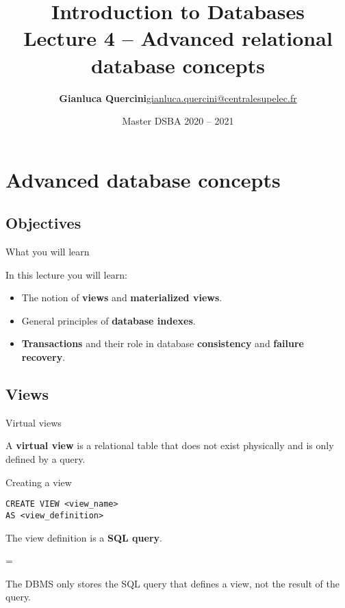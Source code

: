 \documentclass[xcolor=table]{beamer}
\title[Information systems and programming]{{\bf Introduction to Databases}\\Lecture 4 -- Advanced relational database concepts}
\author[Gianluca Quercini]{%
  {\bf Gianluca Quercini}\newline \vfill \href{mailto:gianluca.quercini@centralesupelec.fr}{\small gianluca.quercini@centralesupelec.fr} \vfill}
\date{Master DSBA 2020 -- 2021}
\newenvironment{warning}
  {\par\begin{mdframed}[linewidth=2pt,linecolor=darkred]%
    \begin{list}{}{\leftmargin=1cm
                   \labelwidth=\leftmargin}\item[\Large\ding{43}]}
  {\end{list}\end{mdframed}\par}
\begin{document}
{
\begin{frame}
  \titlepage
\end{frame}
}
\addtocounter{framenumber}{-1}

\logo{}

\section{Advanced database concepts}

\subsection{Objectives}

\begin{frame}{What you will learn}
  
  In this lecture you will learn:
  \vfill
\begin{itemize}
  
  \item The notion of {\bf views} and {\bf materialized views}.
  \vfill
  
  \item General principles of {\bf database indexes}.
  \vfill
  
  \item {\bf Transactions} and their role in database {\bf consistency} and {\bf failure recovery}.
  
  
\end{itemize}

\end{frame}

\subsection{Views}

\begin{frame}[fragile]{Virtual views}
  \begin{definition}
    A {\bf virtual view} is a relational table that does not exist physically
    and is only defined by a query.
  \end{definition}
  \vfill
  \begin{exampleblock}{Creating a view}
\begin{verbatim}
CREATE VIEW <view_name>
AS <view_definition>
\end{verbatim}
    The view definition is a {\bf SQL query}.
\end{exampleblock}
\vfill
\begin{warning}
  The DBMS only stores the SQL query that defines a view, not the 
  result of the query.
\end{warning}
\end{frame}
\end{document}
